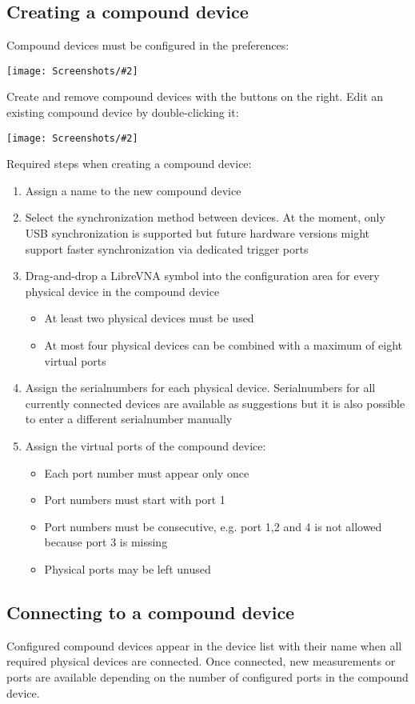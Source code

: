 \documentclass[a4paper,11pt]{article}
\newcommand{\screenshot}[2]{\begin{center}
\texttt{[image: Screenshots/\#2]}
\end{center}}
\begin{document}
\subsection{Creating a compound device}
Compound devices must be configured in the preferences: 
\screenshot{1.0}{CompoundDeviceList.png}
Create and remove compound devices with the buttons on the right. Edit an existing compound device by double-clicking it:
\screenshot{1.0}{CompoundDeviceEdit.png}
Required steps when creating a compound device:
\begin{enumerate}
\item Assign a name to the new compound device
\item Select the synchronization method between devices. At the moment, only USB synchronization is supported but future hardware versions might support faster synchronization via dedicated trigger ports
\item Drag-and-drop a LibreVNA symbol into the configuration area for every physical device in the compound device
\begin{itemize}
\item At least two physical devices must be used
\item At most four physical devices can be combined with a maximum of eight virtual ports
\end{itemize}
\item Assign the serialnumbers for each physical device. Serialnumbers for all currently connected devices are available as suggestions but it is also possible to enter a different serialnumber manually
\item Assign the virtual ports of the compound device:
\begin{itemize}
\item Each port number must appear only once
\item Port numbers must start with port 1
\item Port numbers must be consecutive, e.g. port 1,2 and 4 is not allowed because port 3 is missing
\item Physical ports may be left unused
\end{itemize}
\end{enumerate}

\subsection{Connecting to a compound device}
Configured compound devices appear in the device list with their name when all required physical devices are connected. Once connected, new measurements or ports are available depending on the number of configured ports in the compound device.
\end{document}
